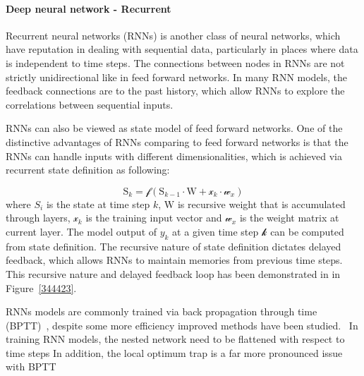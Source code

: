 \paragraph{Deep neural network - Recurrent}
Recurrent neural networks (RNNs) is another class of neural networks, which have reputation in dealing with sequential data, particularly in places where data is independent to time steps. The connections between nodes in RNNs are not strictly unidirectional like in feed forward networks. In many RNN models, the feedback connections are to the past history, which allow RNNs to explore the correlations between sequential inputs.   
\par 
RNNs can also be viewed as state model of feed forward networks. One of the distinctive advantages of RNNs comparing to feed forward networks is that the RNNs can handle inputs with different dimensionalities, which is achieved via recurrent state definition as following:

\begin{equation}
    \mathrm{S}_k = \mathcal{f}(\mathrm{S}_{k-1} \cdot \mathrm{W} + \mathcal{x}_k \cdot \mathcal{w}_x)
\end{equation}
where $S_i$ is the state at time step $k$, $\mathrm{W}$ is recursive weight that is accumulated through layers, $\mathcal{x}_k$ is the training input vector and $\mathcal{w}_x$ is the weight matrix at current layer. The model output of $y_k$ at a given time step $\mathcal{k}$ can be computed from state definition. The recursive nature of state definition dictates delayed feedback, which allows RNNs to maintain memories from previous time steps. This recursive nature and delayed feedback loop has been demonstrated in in Figure~\ref{344423}. 
\par 
RNNs models are commonly trained via back propagation through time (BPTT)~\cite{Goodfellow-et-al-2016}, despite some more efficiency improved methods have been studied.~\cite{963769,neco.1989,Gomez:2008:ANE:1390681.1390712} In training RNN models, the nested network need to be flattened with respect to time steps
In addition, the local optimum trap is a far more pronounced issue with BPTT~\cite{Cu_llar}